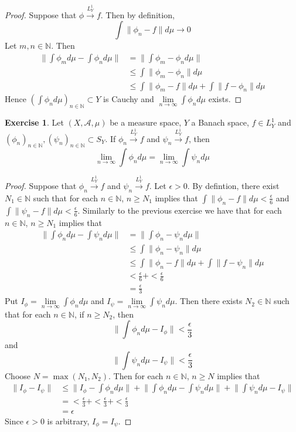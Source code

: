 \documentclass[12pt]{amsart}
\theoremstyle{definition}
\newtheorem{ex}[definition]{Exercise}
\newcommand{\ep}{\epsilon}
\newcommand{\N}{\mathbb{N}}
\newcommand{\MA}{\mathcal{A}}
\newcommand{\conv}[1]{\xrightarrow{#1}}
\newcommand{\lex}[1]{\label{ex:#1}}
\begin{document}
	\begin{proof}
	Suppose that $\phi \conv{L^1_Y} f$. Then by definition, $$\int \|\phi_n -f\| d\mu \rightarrow 0$$ Let $m,n \in \N$. Then 
	\begin{align*}
	\bigg \|\int \phi_m d\mu - \int \phi_n d\mu \bigg \| 
	&= \bigg \| \int \phi_m  - \phi_n d\mu  \bigg \| \\
	& \leq  \int \|\phi_m  - \phi_n\| d \mu \\
	& \leq \int \|\phi_m  - f \| d \mu + \int \|f  - \phi_n\| d \mu
	\end{align*}
	Hence $( \int \phi_n  d \mu)_{n \in \N} \subset Y$ is Cauchy and $\lim\limits_{n \rightarrow \infty} \int \phi_n d\mu$ exists.
\end{proof}		

	\begin{ex} \lex{00000} 
	Let $(X, \MA, \mu)$ be a measure space, $Y$ a Banach space, $f \in L^1_Y$ and $(\phi_n)_{n \in \N}, (\psi_n)_{n \in \N} \subset S_Y$. If $\phi_n \conv{L^1_Y} f$ and $\psi_n \conv{L^1_Y} f$, then $$\lim\limits_{n \rightarrow \infty} \int \phi_n d\mu = \lim\limits_{n \rightarrow \infty} \int \psi_n d\mu$$
	\end{ex}
	
	\begin{proof}
	Suppose that $\phi_n \conv{L^1_Y} f$ and $\psi_n \conv{L^1_Y} f$. Let $\ep >0$. By defintion, there exist $N_1 \in \N$ such that for each $n \in \N$, $ n \geq N_1$ implies that $\int \|\phi_n - f\| d\mu < \frac{\ep}{6}$ and $\int \|\psi_n - f\| d\mu < \frac{\ep}{6}$. Similarly to the previous exercise we have that for each $n \in \N$, $n \geq N_1$ implies that
	\begin{align*}
	\bigg \| \int \phi_n d\mu  - \int \psi_n d \mu \bigg \|
	&= \bigg \| \int \phi_n - \psi_n d\mu \bigg \| \\
	& \leq \int \| \phi_n - \psi_n \| d\mu \\
	& \leq  \int \| \phi_n -f \| d \mu + \int \| f - \psi_n \| d\mu 	\\
	& <  \frac{\ep}{6} + < \frac{\ep}{6} \\
	&= \frac{\ep}{3}
	\end{align*}	 
Put $I_\phi = \lim\limits_{n \rightarrow \infty} \int \phi_n d\mu$ and $I_{\psi} = \lim\limits_{n \rightarrow \infty} \int \psi_n d\mu$. Then there exists $N_2 \in \N$ such that for each $n \in \N$, if $ n \geq N_2$, then $$\bigg \| \int \phi_n d\mu - I_\phi \bigg \| < \frac{\ep}{3}$$ and $$\bigg \| \int \psi_n d\mu - I_\psi \bigg \| < \frac{\ep}{3}$$ 
	Choose $N = \max(N_1, N_2)$. Then for each $n \in \N$, $n \geq N$ implies that
	\begin{align*}
	\|I_\phi - I_\psi\| 
	& \leq \bigg \|I_\phi - \int \phi_n d\mu \bigg \| + \bigg \| \int \phi_n d\mu - \int \psi_n d\mu \bigg \| +  \bigg \| \int \psi_n d\mu - I_\psi \bigg \| \\
	& = < \frac{\ep}{3} + < \frac{\ep}{3} + < \frac{\ep}{3} \\
	&= \ep
	\end{align*}
	Since $\ep >0$ is arbitrary, $I_\phi = I_\psi$.
	\end{proof}
	
\end{document}
